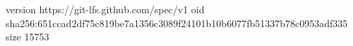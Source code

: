version https://git-lfs.github.com/spec/v1
oid sha256:651ccad2df75c819be7a1356c3089f24101b10b6077fb51337b78c0953adf335
size 15753
